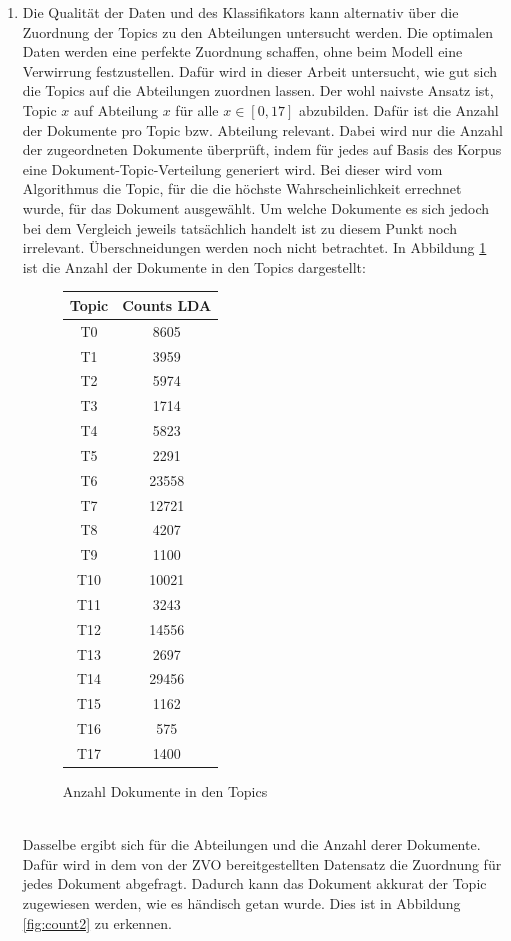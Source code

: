 \documentclass[german,version-2020-11]{uzl-thesis}
\begin{document}
\begin{itemize}
\begin{enumerate}
\item Die Qualität der Daten und des Klassifikators kann alternativ über die Zuordnung der Topics zu den Abteilungen untersucht werden. Die optimalen Daten werden eine perfekte Zuordnung schaffen, ohne beim Modell eine Verwirrung festzustellen. Dafür wird in dieser Arbeit untersucht, wie gut sich die Topics auf die Abteilungen zuordnen lassen. Der wohl naivste Ansatz ist, Topic $x$ auf Abteilung $x$ für alle $x \in [0,17]$ abzubilden. Dafür ist die Anzahl der Dokumente pro Topic bzw. Abteilung relevant. Dabei wird nur die Anzahl der zugeordneten Dokumente überprüft, indem für jedes auf Basis des Korpus eine Dokument-Topic-Verteilung generiert wird. Bei dieser wird vom Algorithmus die Topic, für die die höchste Wahrscheinlichkeit errechnet wurde, für das Dokument ausgewählt. Um welche Dokumente es sich jedoch bei dem Vergleich jeweils tatsächlich handelt ist zu diesem Punkt noch irrelevant. Überschneidungen werden noch nicht betrachtet. In Abbildung \ref{fig:count1} ist die Anzahl der Dokumente in den Topics dargestellt:

\begin{figure}[H]
\begin{center}
\begin{tabular}{cc}
\hline 
\hline
Topic&Counts LDA\\
\hline
T0&8605\\
T1&3959\\
T2&5974\\
T3&1714\\
T4&5823\\
T5&2291\\
T6&23558\\
T7&12721\\
T8&4207\\
T9&1100\\
T10&10021\\
T11&3243\\
T12&14556\\
T13&2697\\
T14&29456\\
T15&1162\\
T16&575\\
T17&1400\\
\hline
\hline
\end{tabular}
\caption{Anzahl Dokumente in den Topics}
\label{fig:count1}
\end{center}
\end{figure}
\\
Dasselbe ergibt sich für die Abteilungen und die Anzahl derer Dokumente. Dafür wird in dem von der ZVO bereitgestellten Datensatz die Zuordnung für jedes Dokument abgefragt. Dadurch kann das Dokument akkurat der Topic zugewiesen werden, wie es händisch getan wurde. Dies ist in Abbildung \ref{fig:count2} zu erkennen. \\ 


\end{enumerate}
\end{itemize}
\end{document}
